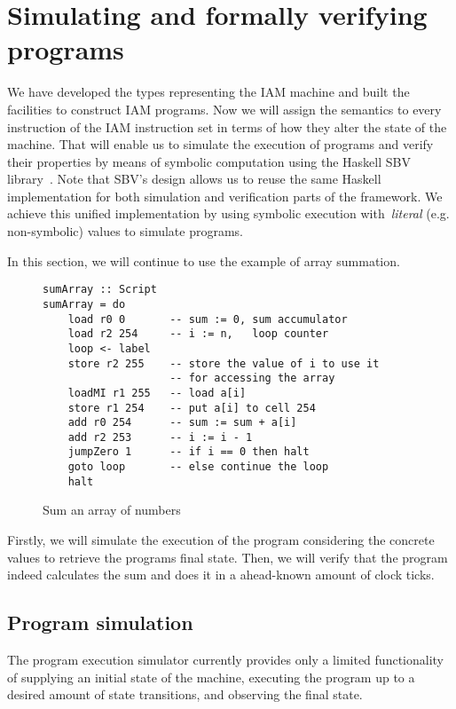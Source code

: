 \section{Simulating and formally verifying programs}
\label{sec:Verification}

We have developed the types representing the IAM machine and built the facilities
to construct IAM programs. Now we will assign the semantics to every instruction
of the IAM instruction set in terms of how they alter the state of the machine.
That will enable us to simulate the execution of programs and verify their properties
by means of symbolic computation using the Haskell SBV library~\cite{SBV}.
Note that SBV's design allows us to reuse the same Haskell implementation for
both simulation and verification parts of the framework. We achieve this unified
implementation by using symbolic execution with~\emph{literal} (e.g. non-symbolic)
values to simulate programs.

In this section, we will continue to use the example of array summation.

\begin{figure}[H]
\begin{verbatim}
sumArray :: Script
sumArray = do
    load r0 0       -- sum := 0, sum accumulator
    load r2 254     -- i := n,   loop counter
    loop <- label
    store r2 255    -- store the value of i to use it
                    -- for accessing the array
    loadMI r1 255   -- load a[i]
    store r1 254    -- put a[i] to cell 254
    add r0 254      -- sum := sum + a[i]
    add r2 253      -- i := i - 1
    jumpZero 1      -- if i == 0 then halt
    goto loop       -- else continue the loop
    halt
\end{verbatim}
\caption{Sum an array of numbers}
\label{arraySum}
\end{figure}

Firstly, we will simulate the execution of the program considering the concrete
values to retrieve the programs final state. Then, we will verify that the program
indeed calculates the sum and does it in a ahead-known amount of clock ticks.

\subsection{Program simulation}

The program execution simulator currently provides only a limited functionality
of supplying an initial state of the machine, executing the program up to a
desired amount of state transitions, and observing the final state.

